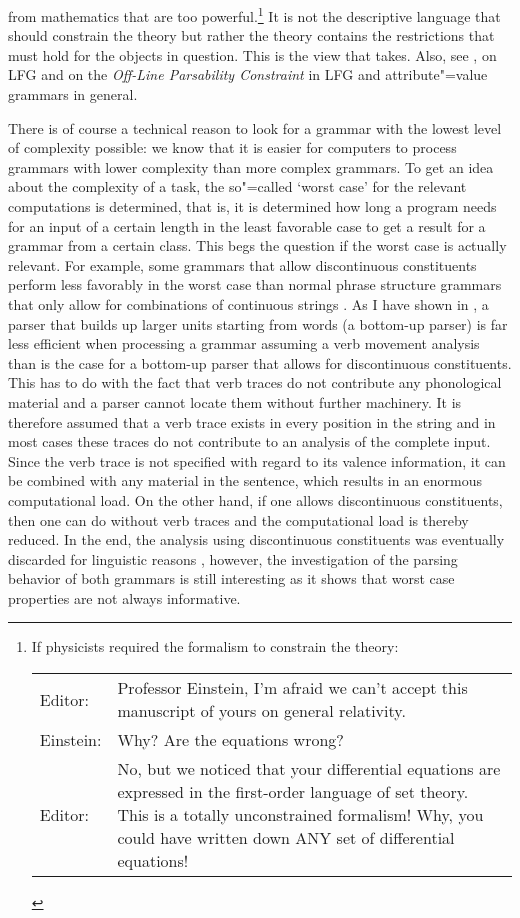 from mathematics that are too powerful.\footnote{%
If physicists required the formalism to constrain the theory:\\
\begin{tabular}{@{}l@{~}p{11cm}}
Editor:   & Professor Einstein, I'm afraid we can't accept this manuscript of yours on general relativity.\\
Einstein: & Why? Are the equations wrong?\\
Editor:   & No, but we noticed that your differential equations are
    expressed in the first-order language of set theory. This is
    a totally unconstrained formalism! Why, you could have written
    down ANY set of differential equations! \citep{Pollard96a}
\end{tabular}
}
It is not the descriptive language that should constrain the theory but rather the theory contains the restrictions
that must hold for the objects in question. This is the view that \citet[, 280]{Chomsky81b} takes. Also, see 
,
 on LFG and  on the \emph{Off-Line Parsability Constraint}
in LFG and attribute"=value grammars in general.

There is of course a technical reason to look for a grammar with the lowest level of complexity possible:
we know that it is easier for computers to process grammars with lower complexity than more
complex grammars. To get an idea about the complexity of a task, the so"=called `worst case' for the
relevant computations is determined, that is, it is determined how long a program needs for an input
of a certain length in the least favorable case to get a result for a grammar from a certain class. This begs the question if the worst case is actually relevant. 
For example, some grammars that allow discontinuous constituents perform less favorably in the worst case than normal phrase structure grammars 
that only allow for combinations of continuous strings \citep[Section~8]{Reape91}.
As I have shown in , a parser that builds up larger units starting from words (a bottom-up parser) is far less
efficient when processing a grammar assuming a verb movement analysis than is the case for a bottom-up parser that allows for discontinuous constituents.
This has to do with the fact that verb traces do not contribute any phonological material and a parser cannot locate them without further machinery.
It is therefore assumed that a verb trace exists in every position in the string and in most cases
these traces do not contribute to an analysis of the complete input.
Since the verb trace is not specified with regard to its valence information, it can be combined
with any material in the sentence, which results in an enormous computational load.
On the other hand, if one allows discontinuous constituents, then one can do without verb traces and the computational load is thereby reduced.
In the end, the analysis using discontinuous constituents was eventually discarded for linguistic reasons \citep{Mueller2005c,Mueller2005d,MuellerLehrbuch1,MuellerGS},
however, the investigation of the parsing behavior of both grammars is still interesting as it shows that worst case properties are not always
informative.


